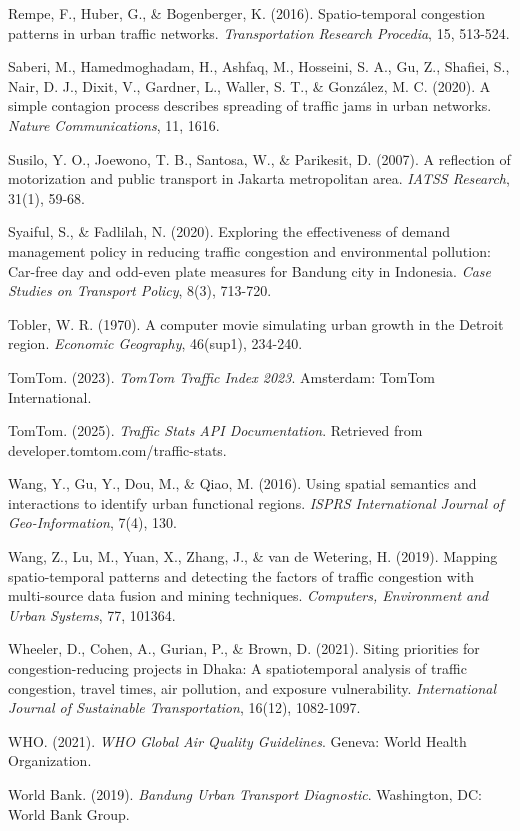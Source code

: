 \documentclass[12pt,a4paper]{article}
\begin{document}
Rempe, F., Huber, G., \& Bogenberger, K. (2016). Spatio-temporal congestion patterns in urban traffic networks. \emph{Transportation Research Procedia}, 15, 513-524.

Saberi, M., Hamedmoghadam, H., Ashfaq, M., Hosseini, S. A., Gu, Z., Shafiei, S., Nair, D. J., Dixit, V., Gardner, L., Waller, S. T., \& Gonz\'{a}lez, M. C. (2020). A simple contagion process describes spreading of traffic jams in urban networks. \emph{Nature Communications}, 11, 1616.

Susilo, Y. O., Joewono, T. B., Santosa, W., \& Parikesit, D. (2007). A reflection of motorization and public transport in Jakarta metropolitan area. \emph{IATSS Research}, 31(1), 59-68.

Syaiful, S., \& Fadlilah, N. (2020). Exploring the effectiveness of demand management policy in reducing traffic congestion and environmental pollution: Car-free day and odd-even plate measures for Bandung city in Indonesia. \emph{Case Studies on Transport Policy}, 8(3), 713-720.

Tobler, W. R. (1970). A computer movie simulating urban growth in the Detroit region. \emph{Economic Geography}, 46(sup1), 234-240.

TomTom. (2023). \emph{TomTom Traffic Index 2023}. Amsterdam: TomTom International.

TomTom. (2025). \emph{Traffic Stats API Documentation}. Retrieved from developer.tomtom.com/traffic-stats.

Wang, Y., Gu, Y., Dou, M., \& Qiao, M. (2016). Using spatial semantics and interactions to identify urban functional regions. \emph{ISPRS International Journal of Geo-Information}, 7(4), 130.

Wang, Z., Lu, M., Yuan, X., Zhang, J., \& van de Wetering, H. (2019). Mapping spatio-temporal patterns and detecting the factors of traffic congestion with multi-source data fusion and mining techniques. \emph{Computers, Environment and Urban Systems}, 77, 101364.

Wheeler, D., Cohen, A., Gurian, P., \& Brown, D. (2021). Siting priorities for congestion-reducing projects in Dhaka: A spatiotemporal analysis of traffic congestion, travel times, air pollution, and exposure vulnerability. \emph{International Journal of Sustainable Transportation}, 16(12), 1082-1097.

WHO. (2021). \emph{WHO Global Air Quality Guidelines}. Geneva: World Health Organization.

World Bank. (2019). \emph{Bandung Urban Transport Diagnostic}. Washington, DC: World Bank Group.
\end{document}
